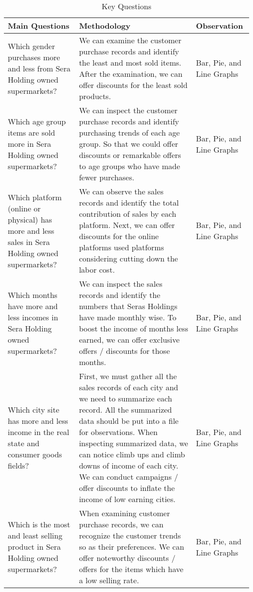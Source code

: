 \documentclass[12pt,a4Paper]{article}
\begin{document}
\begin{table}
\centering
\begin{tabularx}{\textwidth}{XXX}\hline
\textbf{Main Questions} & \textbf{Methodology} & \textbf{Observation}\\\hline
Which gender purchases more and less from Sera Holding owned supermarkets? & We can examine the customer purchase records and identify the least and most sold items. After the examination, we can offer discounts for the least sold products. & Bar, Pie, and Line Graphs\\\hline
Which age group items are sold more in Sera Holding owned supermarkets? & We can inspect the customer purchase records and identify purchasing trends of each age group. So that we could offer discounts or remarkable offers to age groups who have made fewer purchases. & Bar, Pie, and Line Graphs\\\hline
Which platform (online or physical) has more and less sales in Sera Holding owned supermarkets? & We can observe the sales records and identify the total contribution of sales by each platform. Next, we can offer discounts for the online platforms used platforms considering cutting down the labor cost. & Bar, Pie, and Line Graphs\\\hline
Which months have more and less incomes in Sera Holding owned supermarkets? & We can inspect the sales records and identify the numbers that Seras Holdings have made monthly wise. To boost the income of months less earned, we can offer exclusive offers / discounts for those months. & Bar, Pie, and Line Graphs\\\hline
Which city site has more and less income in the real state and consumer goods fields? & First, we must gather all the sales records of each city and we need to summarize each record. All the summarized data should be put into a file for observations. When inspecting summarized data, we can notice climb ups and climb downs of income of each city. We can conduct campaigns / offer discounts to inflate the income of low earning cities. & Bar, Pie, and Line Graphs\\\hline
Which is the most and least selling product in Sera Holding owned supermarkets? & When examining customer purchase records, we can recognize the customer trends so as their preferences. We can offer noteworthy discounts / offers for the items which have a low selling rate. & Bar, Pie, and Line Graphs\\\hline
\end{tabularx}
\caption{Key Questions}
\end{table}
\newpage
\end{document}
